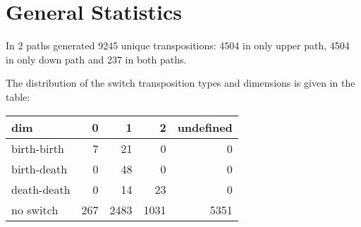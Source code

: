 \documentclass{article}
\begin{document}
\section{General Statistics}
\par In 2 paths generated 9245 unique transpositions: 4504 in only upper path, 4504 in only down path and 237 in both paths.
\par The distribution of the switch transposition types and dimensions is given in the table:
\begin{center}
\begin{tabular}{lrrrr}
\toprule
dim & 0 & 1 & 2 & undefined \\
\midrule
birth-birth & 7 & 21 & 0 & 0 \\
birth-death & 0 & 48 & 0 & 0 \\
death-death & 0 & 14 & 23 & 0 \\
no switch & 267 & 2483 & 1031 & 5351 \\
\bottomrule
\end{tabular}

\end{center}
\end{document}
